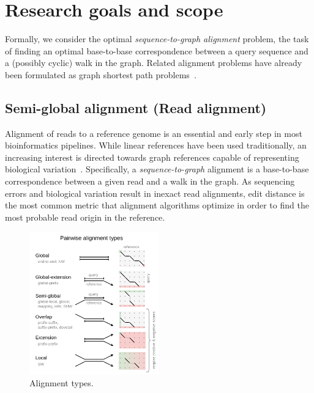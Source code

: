 \section{Research goals and scope}

Formally, we consider the optimal \emph{sequence-to-graph alignment} problem,
the task of finding an optimal base-to-base correspondence between a query
sequence and a (possibly cyclic) walk in the graph. Related alignment problems
have already been formulated as graph shortest path
problems~\cite{jain_complexity_2019}.


\subsection{Semi-global alignment (Read alignment)}

Alignment of reads to a reference genome is an essential and early step in most
bioinformatics pipelines. While linear references have been used traditionally,
an increasing interest is directed towards graph references capable of
representing biological variation~\citep{garrison_variation_2018}.
%
Specifically, a \emph{sequence-to-graph} alignment is a base-to-base
correspondence between a given read and a walk in the graph. As sequencing
errors and biological variation result in inexact read alignments, edit distance
is the most common metric that alignment algorithms optimize in order to find
the most probable read origin in the reference.


\begin{figure}[t]
    \includegraphics[width=0.5\textwidth]{alignment-types}
	\caption[Alignment types]{Alignment types.}
    \label{fig:alignment-types}
\end{figure}


